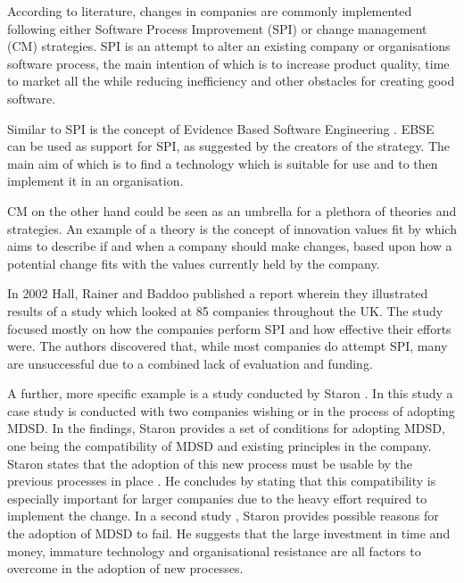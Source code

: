 \documentclass[10pt,twocolumn]{article}
\begin{document}
According to literature, changes in companies are commonly implemented following either Software Process Improvement (SPI)\cite{pettersson2008practitioner}\cite{unterkalmsteiner2012evaluation} or change management (CM) strategies. SPI is an attempt to alter an existing company or organisations software process, the main intention of which is to increase product quality, time to market all the while reducing inefficiency and other obstacles for creating good software. 

Similar to SPI is the concept of Evidence Based Software Engineering \cite{dyba2005evidence}. EBSE can be used as support for SPI, as suggested by the creators of the strategy. The main aim of which is to find a technology which is suitable for use and to then implement it in an organisation.

CM on the other hand could be seen as an umbrella for a plethora of theories and strategies. An example of a theory is the concept of innovation values fit by \cite{klein1996challenge} which aims to describe if and when a company should make changes, based upon how a potential change fits with the values currently held by the company.

In 2002 Hall, Rainer and Baddoo \cite{hall2002implementing} published a report wherein they illustrated results of a study which looked at 85 companies throughout the UK. The study focused mostly on how the companies perform SPI and how effective their efforts were. The authors discovered that, while most companies do attempt SPI, many are unsuccessful due to a combined lack of evaluation and funding.

A further, more specific example is a study conducted by Staron \cite{staron2006adopting}. In this study a case study is conducted with two companies wishing or in the process of adopting MDSD. In the findings, Staron provides a set of conditions for adopting MDSD, one being the compatibility of MDSD and existing principles in the company. Staron states that the adoption of this new process must be usable by the previous processes in place \cite{staron2006adopting}. He concludes by stating that this compatibility is especially important for larger companies due to the heavy effort required to implement the change. In a second study \cite{staron2008transitioning}, Staron provides possible reasons for the adoption of MDSD to fail. He suggests that the large investment in time and money, immature technology and organisational resistance are all factors to overcome in the adoption of new processes.
\end{document}
